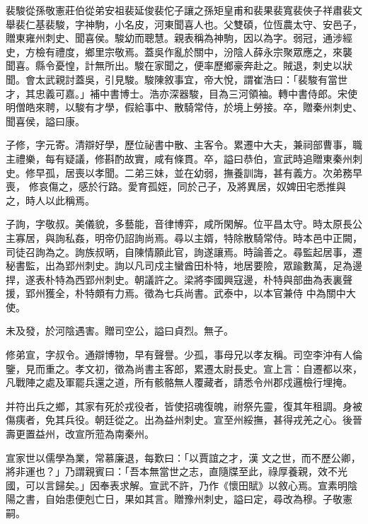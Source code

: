 
\begin{pinyinscope}

 裴駿從孫敬憲莊伯從弟安祖裴延俊裴佗子讓之孫矩皇甫和裴果裴寬裴俠子祥肅裴文舉裴仁基裴駿，字神駒，小名皮，河東聞喜人也。父雙碩，位恆農太守、安邑子，贈東雍州刺史、聞喜侯。駿幼而聰慧。親表稱為神駒，因以為字。弱冠，通涉經史，方檢有禮度，鄉里宗敬焉。蓋吳作亂於關中，汾陰人薛永宗聚眾應之，來襲
 聞喜。縣令憂惶，計無所出。駿在家聞之，便率歷鄉豪奔赴之。賊退，刺史以狀聞。會太武親討蓋吳，引見駿。駿陳敘事宜，帝大悅，謂崔浩曰：「裴駿有當世才，其忠義可嘉。」補中書博士。浩亦深器駿，目為三河領袖。轉中書侍郎。宋使明僧皓來聘，以駿有才學，假給事中、散騎常侍，於境上勞接。卒，贈秦州刺史、聞喜侯，謚曰康。



 子修，字元寄。清辯好學，歷位祕書中散、主客令。累遷中大夫，兼祠部曹事，職主禮樂，每有疑議，修斟酌故實，咸有條貫。卒，謚曰恭伯，宣武時追贈東秦州刺史。修早孤，居喪以孝聞。二弟三妹，並在幼弱，撫養訓誨，甚有義方。次弟務早喪，
 修哀傷之，感於行路。愛育孤姪，同於己子，及將異居，奴婢田宅悉推與之，時人以此稱焉。



 子詢，字敬叔。美儀貌，多藝能，音律博弈，咸所閑解。位平昌太守。時太原長公主寡居，與詢私姦，明帝仍詔詢尚焉。尋以主婿，特除散騎常侍。時本邑中正闕，司徒召詢為之。詢族叔昞，自陳情願此官，詢遂讓焉。時論善之。尋監起居事，遷秘書監，出為郢州刺史。詢以凡司戍主蠻酋田朴特，地居要險，眾踰數萬，足為邊捍，遂表朴特為西郢州刺史。朝議許之。梁將李國興寇邊，朴特與部曲為表裏聲援，郢州獲全，朴特頗有力焉。徵為七兵尚書。武泰中，以本官兼侍
 中為關中大使。



 未及發，於河陰遇害。贈司空公，謚曰貞烈。無子。



 修弟宣，字叔令。通辯博物，早有聲譽。少孤，事母兄以孝友稱。司空李沖有人倫鑒，見而重之。孝文初，徵為尚書主客郎，累遷太尉長史。宣上言：自遷都以來，凡戰陣之處及軍罷兵還之道，所有骸骼無人覆藏者，請悉令州郡戍邏檢行埋掩。



 并符出兵之鄉，其家有死於戎役者，皆使招魂復魄，祔祭先靈，復其年租調。身被傷痍者，免其兵役。朝廷從之。出為益州刺史。宣至州綏撫，甚得戎羌之心。後晉壽更置益州，改宣所蒞為南秦州。



 宣家世以儒學為業，常慕廉退，每歎曰：「以賈誼之才，漢
 文之世，而不歷公卿，將非運也？」乃謂親賓曰：「吾本無當世之志，直隨牒至此，祿厚養親，效不光國，可以言歸矣。」因奉表求解。宣武不許，乃作《懷田賦》以敘心焉。宣素明陰陽之書，自始患便剋亡日，果如其言。贈豫州刺史，謚曰定，尋改為穆。子敬憲嗣。




\end{pinyinscope}
